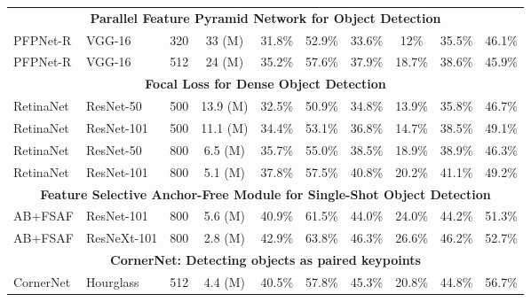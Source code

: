 \documentclass[10pt,twocolumn,letterpaper]{article}
\begin{document}
\begin{table*}[h]
\begin{threeparttable}[h]
\begin{tabular}{llcccccccc}
			\midrule
			\multicolumn{10}{c}{\textbf{Parallel Feature Pyramid Network for Object Detection} \cite{kim2018parallel}} \\
			\rowcolor{cyan}PFPNet-R & VGG-16 & 320 & 33 (M) & 31.8\% & 52.9\% & 33.6\% & 12\% & 35.5\% & 46.1\% \\
			PFPNet-R & VGG-16 & 512 & 24 (M) & 35.2\% & 57.6\% & 37.9\% & 18.7\% & 38.6\% & 45.9\% \\
			\midrule
			\midrule
			\multicolumn{10}{c}{\textbf{Focal Loss for Dense Object Detection} \cite{lin2017focal}} \\
			RetinaNet & ResNet-50 & 500 & 13.9 (M) & 32.5\% & 50.9\% & 34.8\% & 13.9\% & 35.8\% & 46.7\% \\
			RetinaNet & ResNet-101 & 500 & 11.1 (M) & 34.4\% & 53.1\% & 36.8\% & 14.7\% & 38.5\% & 49.1\% \\
			RetinaNet & ResNet-50 & 800 & 6.5 (M) & 35.7\% & 55.0\% & 38.5\% & 18.9\% & 38.9\% & 46.3\% \\
			RetinaNet & ResNet-101 & 800 & 5.1 (M) & 37.8\% & 57.5\% & 40.8\% & 20.2\% & 41.1\% & 49.2\% \\
			\midrule
			\multicolumn{10}{c}{\textbf{Feature Selective Anchor-Free Module for Single-Shot Object Detection \cite{zhu2019feature}}} \\
			AB+FSAF & ResNet-101 & 800 & 5.6 (M) & 40.9\% & 61.5\% & 44.0\% & 24.0\% & 44.2\% & 51.3\% \\
			AB+FSAF & ResNeXt-101 & 800 & 2.8 (M) & 42.9\% & 63.8\% & 46.3\% & 26.6\% & 46.2\% & 52.7\% \\
			\midrule
			\multicolumn{10}{c}{\textbf{CornerNet: Detecting objects as paired keypoints} \cite{law2018cornernet}} \\
			CornerNet & Hourglass & 512 & 4.4 (M) & 40.5\% & 57.8\% & 45.3\% & 20.8\% & 44.8\% & 56.7\% \\
			\bottomrule
		\end{tabular}
	\end{threeparttable}
\end{table*}
\end{document}
